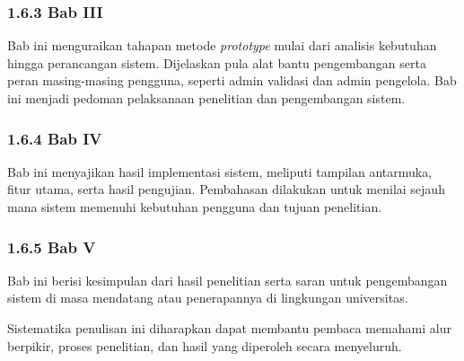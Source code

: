 \subsubsection*{1.6.3 Bab III}
Bab ini menguraikan tahapan metode \textit{prototype} mulai dari analisis kebutuhan hingga perancangan sistem. Dijelaskan pula alat bantu pengembangan serta peran masing-masing pengguna, seperti admin validasi dan admin pengelola. Bab ini menjadi pedoman pelaksanaan penelitian dan pengembangan sistem.\par

\subsubsection*{1.6.4 Bab IV}
Bab ini menyajikan hasil implementasi sistem, meliputi tampilan antarmuka, fitur utama, serta hasil pengujian. Pembahasan dilakukan untuk menilai sejauh mana sistem memenuhi kebutuhan pengguna dan tujuan penelitian.\par

\subsubsection*{1.6.5 Bab V}
Bab ini berisi kesimpulan dari hasil penelitian serta saran untuk pengembangan sistem di masa mendatang atau penerapannya di lingkungan universitas.\par

Sistematika penulisan ini diharapkan dapat membantu pembaca memahami alur berpikir, proses penelitian, dan hasil yang diperoleh secara menyeluruh.